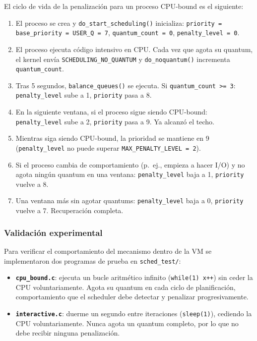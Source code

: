 \documentclass[11pt,a4paper]{article}
\begin{document}
El ciclo de vida de la penalizaci\'on para un proceso CPU-bound es el siguiente:

\begin{enumerate}[leftmargin=*,label=\arabic*.]
  \item El proceso se crea y \texttt{do\_start\_scheduling()} inicializa: \texttt{priority = base\_priority = USER\_Q = 7}, \texttt{quantum\_count = 0}, \texttt{penalty\_level = 0}.
  \item El proceso ejecuta c\'odigo intensivo en CPU. Cada vez que agota su quantum, el kernel env\'ia \texttt{SCHEDULING\_NO\_QUANTUM} y \texttt{do\_noquantum()} incrementa \texttt{quantum\_count}.
  \item Tras 5 segundos, \texttt{balance\_queues()} se ejecuta. Si \texttt{quantum\_count >= 3}: \texttt{penalty\_level} sube a 1, \texttt{priority} pasa a 8.
  \item En la siguiente ventana, si el proceso sigue siendo CPU-bound: \texttt{penalty\_level} sube a 2, \texttt{priority} pasa a 9. Ya alcanz\'o el techo.
  \item Mientras siga siendo CPU-bound, la prioridad se mantiene en 9 (\texttt{penalty\_level} no puede superar \texttt{MAX\_PENALTY\_LEVEL = 2}).
  \item Si el proceso cambia de comportamiento (p.~ej., empieza a hacer I/O) y no agota ning\'un quantum en una ventana: \texttt{penalty\_level} baja a 1, \texttt{priority} vuelve a 8.
  \item Una ventana m\'as sin agotar quantums: \texttt{penalty\_level} baja a 0, \texttt{priority} vuelve a 7. Recuperaci\'on completa.
\end{enumerate}

\subsubsection*{Validaci\'on experimental}

Para verificar el comportamiento del mecanismo dentro de la VM se implementaron dos programas de prueba en \texttt{sched\_test/}:

\begin{itemize}[leftmargin=*]
  \item \textbf{\texttt{cpu\_bound.c}}: ejecuta un bucle aritm\'etico infinito (\texttt{while(1) x++}) sin ceder la CPU voluntariamente. Agota su quantum en cada ciclo de planificaci\'on, comportamiento que el scheduler debe detectar y penalizar progresivamente.
  \item \textbf{\texttt{interactive.c}}: duerme un segundo entre iteraciones (\texttt{sleep(1)}), cediendo la CPU voluntariamente. Nunca agota un quantum completo, por lo que no debe recibir ninguna penalizaci\'on.
\end{itemize}
\end{document}
